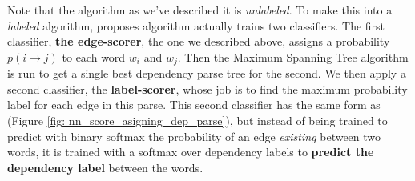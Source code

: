 \documentclass[11pt]{article}
\begin{document}
Note that the algorithm as we’ve described it is \emph{unlabeled}. To make this into a \emph{labeled} algorithm, \citep{dozat2016deep} proposes algorithm actually trains two classifiers. The first classifier, \textbf{the edge-scorer}, the one we described above, assigns a probability $p(i\rightarrow j)$  to each word $w_i$ and $w_j$. Then the Maximum Spanning Tree algorithm is run to get a single best dependency parse tree for the second. We then apply a second classifier, the \textbf{label-scorer}, whose job is to find the maximum probability label for each edge in this parse. This second classifier has the same form as (Figure \ref{fig: nn_score_asigning_dep_parse}), but instead of being trained to predict with binary softmax the probability of an edge \emph{existing} between two words, it is trained with a softmax over
dependency labels to \textbf{predict the dependency label} between the words.



\newpage


\end{document}
